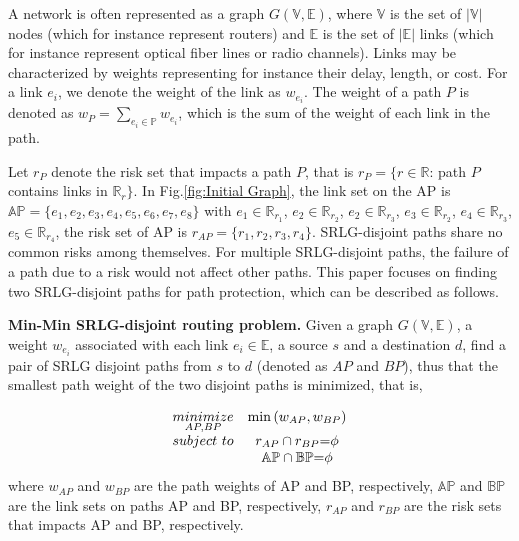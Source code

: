 A network is often represented as a graph $G(\mathbb{V},\mathbb{E})$, where $\mathbb{V}$ is the set of $|\mathbb{V}|$ nodes (which for instance represent routers) and $\mathbb{E}$ is the set of $|\mathbb{E}|$ links (which for instance represent optical fiber lines or radio channels). Links may be characterized by weights representing for instance their delay, length, or cost. For a link $e_i$, we denote the weight of the link as $w_{e_i}$. The weight of a path $P$ is denoted as $w_P=\sum\limits_{e_i\in \mathbb{P}}w_{e_i}$, which is the sum of  the weight of each link in the path.

Let $r_P$ denote the risk set that impacts a path $P$, that is $r_P=\{r\in \mathbb{R}$: path $P$ contains links in $\mathbb{R}_r\}$. In Fig.\ref{fig:Initial Graph}, the link set on the AP is $\mathbb{AP}=\{e_1,e_2,e_3,e_4,e_5,e_6,e_7,e_8\}$ with $e_1\in \mathbb{R}_{r_1}$, $e_2\in \mathbb{R}_{r_2}$, $e_2\in \mathbb{R}_{r_3}$, $e_3\in \mathbb{R}_{r_2}$, $e_4\in \mathbb{R}_{r_3}$, $e_5\in \mathbb{R}_{r_4}$,  the risk set of AP is ${r}_{{AP}}=\{r_1, r_2, r_3, r_4\}$. SRLG-disjoint paths share no common risks among themselves. For multiple SRLG-disjoint paths, the failure of a path due to a risk would not affect other paths. This paper focuses on finding  two SRLG-disjoint paths for path protection, which can be described as follows.


\textbf{Min-Min SRLG-disjoint routing problem.} Given a graph $G(\mathbb{V},\mathbb{E})$, a weight $w_{e_i}$ associated with each link $e_i\in \mathbb{E}$, a source  $s$ and a destination  $d$,  find a pair of SRLG disjoint paths from $s$ to $d$ (denoted as $AP$ and $BP$), thus that  the smallest path weight of the two disjoint paths is minimized, that is,

\begin{equation}
\begin{array}{*{20}{c}}
   {\mathop {minimize}\limits_{AP,BP} } & {\min \left( {{w_{AP}},{w_{BP}}} \right)}  \\
   {subject\ to} & {{r_{AP}} \cap {r_{BP}}{\rm{ = }}\phi }  \\
   {} & {\mathbb{AP} \cap \mathbb{BP}{\rm{ = }}\phi }  \\
\end{array}
\label{eq:problem definition}
\end{equation}
where ${w_{AP}}$ and ${w_{BP}}$ are the path weights of AP and BP, respectively, $\mathbb{AP}$ and $\mathbb{BP}$ are the link sets on paths AP and BP, respectively, ${r_{AP}}$ and ${r_{BP}}$ are the risk sets that impacts AP and BP, respectively.


